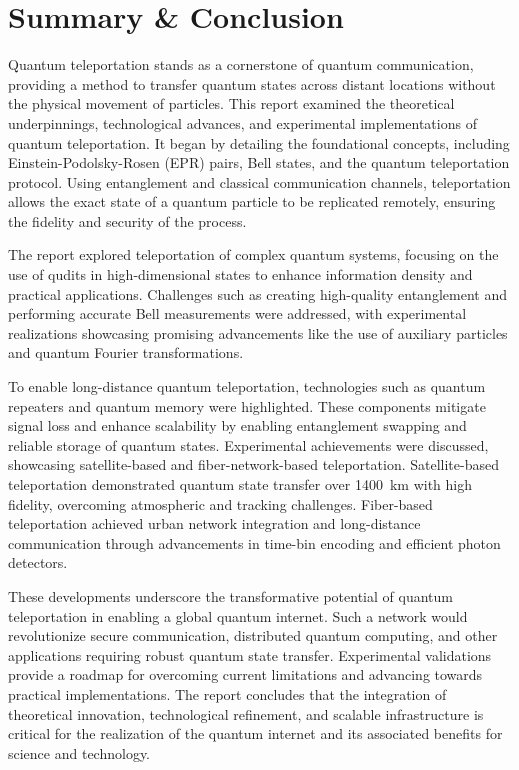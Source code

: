\section{Summary \& Conclusion}
Quantum teleportation stands as a cornerstone of quantum communication, providing a method to transfer quantum states across distant locations without the physical movement of particles. This report examined the theoretical underpinnings, technological advances, and experimental implementations of quantum teleportation. It began by detailing the foundational concepts, including Einstein-Podolsky-Rosen (EPR) pairs, Bell states, and the quantum teleportation protocol. Using entanglement and classical communication channels, teleportation allows the exact state of a quantum particle to be replicated remotely, ensuring the fidelity and security of the process.

The report explored teleportation of complex quantum systems, focusing on the use of qudits in high-dimensional states to enhance information density and practical applications. Challenges such as creating high-quality entanglement and performing accurate Bell measurements were addressed, with experimental realizations showcasing promising advancements like the use of auxiliary particles and quantum Fourier transformations.

To enable long-distance quantum teleportation, technologies such as quantum repeaters and quantum memory were highlighted. These components mitigate signal loss and enhance scalability by enabling entanglement swapping and reliable storage of quantum states. Experimental achievements were discussed, showcasing satellite-based and fiber-network-based teleportation. Satellite-based teleportation demonstrated quantum state transfer over \SI{1400}{\kilo\meter} with high fidelity, overcoming atmospheric and tracking challenges. Fiber-based teleportation achieved urban network integration and long-distance communication through advancements in time-bin encoding and efficient photon detectors.

These developments underscore the transformative potential of quantum teleportation in enabling a global quantum internet. Such a network would revolutionize secure communication, distributed quantum computing, and other applications requiring robust quantum state transfer. Experimental validations provide a roadmap for overcoming current limitations and advancing towards practical implementations. The report concludes that the integration of theoretical innovation, technological refinement, and scalable infrastructure is critical for the realization of the quantum internet and its associated benefits for science and technology.